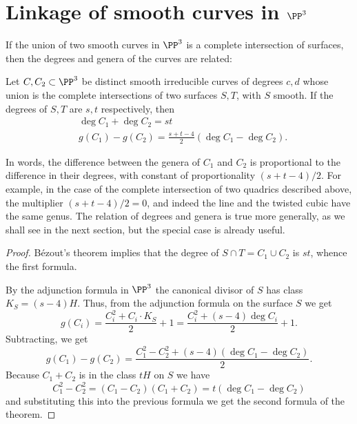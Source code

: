 \section{Linkage of smooth curves in $\PP^3$}\label{SLinkage}\label{linkage section}

If the union of two smooth curves in $\PP^3$ is a complete intersection of surfaces, then the degrees and genera
of the curves are related:

\begin{theorem}\label{liaison genus formula-first version} Let $C, {C_2}\subset \PP^3$ be distinct smooth irreducible curves of degrees $c,d$ whose union is the complete intersections of two surfaces $S,T$, with $S$ smooth. If the degrees of $S,T$ are $s,t$ respectively, then
$$
\begin{aligned}
&\deg C_1+\deg C_2 = st\\
&g(C_1) - g({C_2}) = \frac{s+t-4}{2}(\deg C_1-\deg {C_2}).
\end{aligned}
 $$
\end{theorem}
In words, the difference between the genera of $C_1$ and ${C_2}$ is proportional to the difference in their degrees, with constant of proportionality $(s+t-4)/2$. For example, in the case of the complete intersection of two quadrics
described above, the multiplier $(s+t-4)/2 = 0$, and indeed the line and the twisted cubic have the same genus.
The relation of degrees and genera is true more generally, as we shall see in the next section, but the special
case is already useful.

\begin{proof}
B\'ezout's theorem implies that the degree of $S\cap T = C_1\cup C_2$ is $st$, whence the first formula.

By the adjunction formula in $\PP^3$ the canonical divisor of $S$ has class $K_S = (s-4)H$. Thus, from the 
adjunction formula on the surface $S$ we get
$$
g(C_i) = \frac{C_i^2+C_i\cdot K_S}{2}+1 = \frac{C_i^2+(s-4) \deg C_i}{2}+1.
$$
Subtracting, we get
$$
g(C_1)-g(C_2) = \frac{C_1^2-C_2^2+(s-4) (\deg C_1-\deg C_2)} {2}.
$$
Because $C_1+C_2$ is in the class $tH$ on $S$ we have
$$
C_1^2-C_2^2 = (C_1-C_2)(C_1+C_2) = t(\deg C_1-\deg C_2)
$$
and substituting this into the previous formula we get the second formula of the theorem.
\end{proof}


